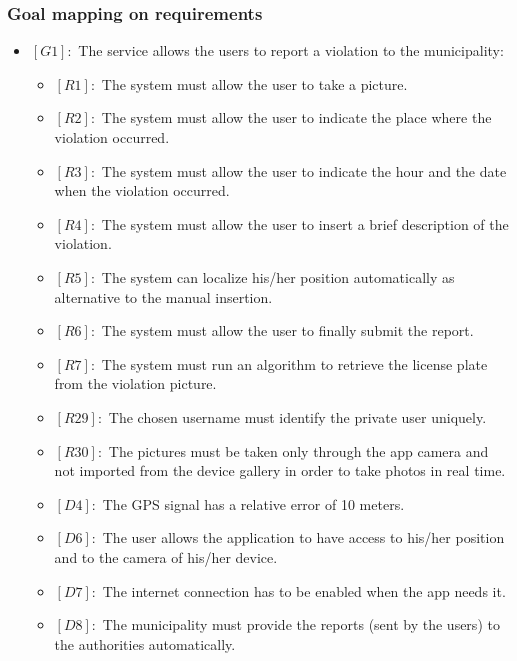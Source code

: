 \documentclass[titlepage]{article}
\begin{document}
\subsubsection{Goal mapping on requirements}
\begin{itemize}
 \item $[G1]:$ The service allows the users to report a violation to the municipality:
 \begin{itemize}
 	\item $[R1]:$ The system must allow the user to take a picture.
 	\item $[R2]:$ The system must allow the user to indicate the place where the violation occurred.
 	\item $[R3]:$ The system must allow the user to indicate the hour and the date when the violation occurred.
 	\item $[R4]:$ The system must allow the user to insert a brief description of the violation.
 	\item $[R5]:$ The system can localize his/her position automatically as alternative to the manual insertion.
 	\item $[R6]:$ The system must allow the user to finally submit the report.
 	\item $[R7]:$ The system must run an algorithm to retrieve the license plate from the violation picture.
 	\item $[R29]:$ The chosen username must identify the private user uniquely.
 	\item $[R30]:$ The pictures must be taken only through the app camera and not imported from the device gallery in order to take photos in real time.
 	\item $[D4]:$ The GPS signal has a relative error of 10 meters.
 	\item $[D6]:$ The user allows the application to have access to his/her position and to the camera of his/her device.
 	\item $[D7]:$ The internet connection has to be enabled when the app needs it.
 	\item $[D8]:$ The municipality must provide the reports (sent by the users) to the authorities automatically.


\end{itemize}
\end{itemize}
\end{document}
